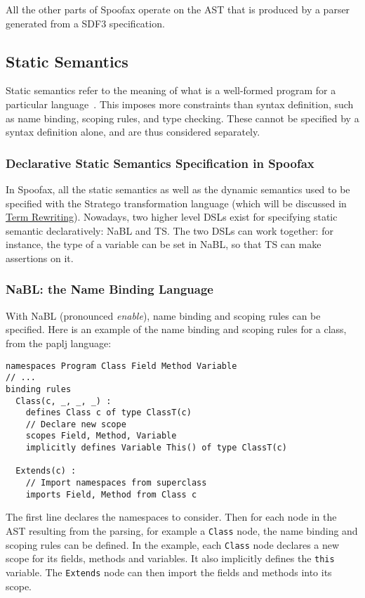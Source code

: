 All the other parts of Spoofax operate on the AST that is produced by
a parser generated from a SDF3 specification.
\subsection{Static Semantics}
\label{sec-static-analysis}
Static semantics refer to the meaning of what is a well-formed program
for a particular language~\cite{Milner97}. This imposes more
constraints than syntax definition, such as name binding, scoping
rules, and type checking. These cannot be specified by a syntax
definition alone, and are thus considered separately.
\subsubsection{Declarative Static Semantics Specification in Spoofax}
\label{sec:orgheadline1}
In Spoofax, all the static semantics as well as the dynamic semantics
used to be specified with the Stratego transformation language (which
will be discussed in \hyperref[sec-term-rewrite]{Term Rewriting}). Nowadays, two higher level DSLs
exist for specifying static semantic declaratively: NaBL and TS. The
two DSLs can work together: for instance, the type of a variable can
be set in NaBL, so that TS can make assertions on it.
\subsubsection{NaBL: the Name Binding Language}
\label{sec:orgheadline2}
With NaBL (pronounced \emph{enable}), name binding and scoping rules can be
specified. Here is an example of the name binding and scoping rules
for a class, from the paplj language:
\begin{verbatim}
namespaces Program Class Field Method Variable
// ...
binding rules
  Class(c, _, _, _) :
    defines Class c of type ClassT(c)
    // Declare new scope
    scopes Field, Method, Variable
    implicitly defines Variable This() of type ClassT(c)

  Extends(c) :
    // Import namespaces from superclass
    imports Field, Method from Class c
\end{verbatim}
The first line declares the namespaces to
consider. Then for each node in the AST resulting from the parsing,
for example a \texttt{Class} node, the name binding and scoping rules can be
defined. In the example, each \texttt{Class} node declares a new scope for
its fields, methods and variables. It also implicitly defines the
\texttt{this} variable. The \texttt{Extends} node can then import the fields and
methods into its scope.

